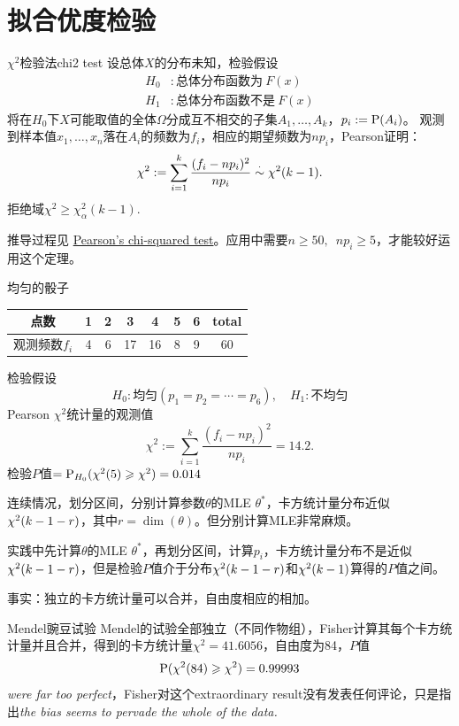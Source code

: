 \section{拟合优度检验}
\begin{theorem}[lines before break=6]{$\chi^2$检验法}{chi2 test}
	设总体$X$的分布未知，检验假设
	\begin{align*}
		H_0&:\text{总体分布函数为}~F(x)\\
		H_1&:\text{总体分布函数不是}~F(x)
	\end{align*}
	将在$H_0$下$X$可能取值的全体$\Omega$分成互不相交的子集$A_1,\ldots,A_k$，$p_i := \P(A_i)$。
	观测到样本值$x_1,\ldots,x_n$落在$A_i$的频数为$f_i$，相应的期望频数为$np_i$，Pearson证明：
	\begin{equation}
		\chi^2 := \sum_{i=1}^k\frac{(f_i - np_i)^2}{np_i} \dotsim \ChiSqDist(k - 1).
	\end{equation}
	拒绝域$\chi^2 \geqslant \chi^2_\alpha(k - 1).$
\end{theorem}
推导过程见 \href{https://en.wikipedia.org/wiki/Pearson%27s_chi-squared_test}{Pearson's chi-squared test}。应用中需要$n\geqslant 50,\enspace np_i\geqslant 5$，才能较好运用这个定理。
\begin{example}{均匀的骰子}{}
	\begin{center}
		\begin{tabular}{cccccccc}
			\toprule
			点数&1&2&3&4&5&6&total\\
			\midrule
			观测频数$f_i$&4&6&17&16&8&9&60\\
			\bottomrule
		\end{tabular}
	\end{center}
	检验假设
	\[
		H_0:\text{均匀}(p_1 = p_2 = \cdots = p_6),\quad H_1:\text{不均匀}
	\]
	Pearson $\chi^2$统计量的观测值
	\[
		\chi^2 := \sum_{i=1}^k\frac{(f_i - np_i)^2}{np_i} = 14.2.
	\]
	检验$P$值$= \P_{H_0}(\ChiSqDist(5) \geqslant \chi^2) = 0.014$
\end{example}
连续情况，划分区间，分别计算参数$\theta$的MLE $\theta^\ast$，卡方统计量分布近似$\ChiSqDist(k - 1 - r)$，其中$r = \dim(\theta)$。但分别计算MLE非常麻烦。

实践中先计算$\theta$的MLE $\theta^\ast$，再划分区间，计算$p_i$，卡方统计量分布不是近似$\ChiSqDist(k - 1 - r)$，但是检验$P$值介于分布$\ChiSqDist(k - 1 - r)$和$\ChiSqDist(k - 1)$算得的$P$值之间。

事实：独立的卡方统计量可以合并，自由度相应的相加。
\begin{example}{Mendel豌豆试验}{}
	Mendel的试验全部独立（不同作物组），Fisher计算其每个卡方统计量并且合并，得到的卡方统计量$\chi^2 = 41.6056$，自由度为84，$P$值
	\[
		\P(\ChiSqDist(84) \geqslant \chi^2) = 0.99993
	\]
	\textit{were far too perfect}，Fisher对这个extraordinary result没有发表任何评论，只是指出\textit{the bias seems to pervade the whole of the data.}
\end{example}
